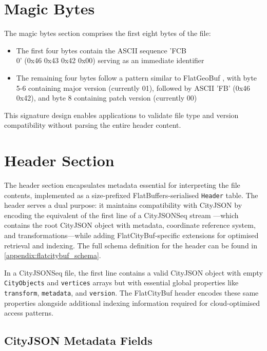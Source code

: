 \section{Magic Bytes}
\label{methodology:file_components:magic_bytes}

The magic bytes section comprises the first eight bytes of the file:
\begin{itemize}
  \item The first four bytes contain the ASCII sequence 'FCB\\0' (0x46 0x43 0x42 0x00) serving as an immediate identifier
  \item The remaining four bytes follow a pattern similar to FlatGeoBuf \citep{flatgeobuf}, with byte 5-6 containing major version (currently 01), followed by ASCII 'FB' (0x46 0x42), and byte 8 containing patch version (currently 00)
\end{itemize}

This signature design enables applications to validate file type and version compatibility without parsing the entire header content.

\section{Header Section}
\label{methodology:file_components:header}

The header section encapsulates metadata essential for interpreting the file contents, implemented as a size-prefixed FlatBuffers-serialised \texttt{Header} table. The header serves a dual purpose: it maintains compatibility with CityJSON by encoding the equivalent of the first line of a CityJSONSeq stream \citep{ledoux_2024}—which contains the root CityJSON object with metadata, coordinate reference system, and transformations—while adding FlatCityBuf-specific extensions for optimised retrieval and indexing. The full schema definition for the header can be found in \autoref{appendix:flatcitybuf_schema}.

In a CityJSONSeq file, the first line contains a valid CityJSON object with empty \texttt{CityObjects} and \texttt{vertices} arrays but with essential global properties like \texttt{transform}, \texttt{metadata}, and \texttt{version}. The FlatCityBuf header encodes these same properties alongside additional indexing information required for cloud-optimised access patterns.

\subsection{CityJSON Metadata Fields}
\label{methodology:header:cityjson_fields}

